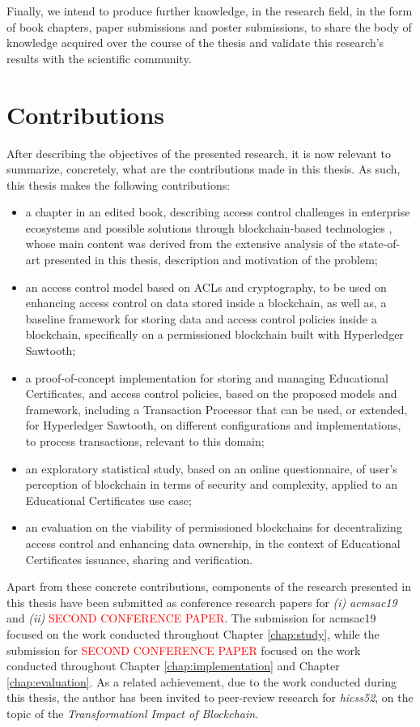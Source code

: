 Finally, we intend to produce further knowledge, in the research field, in the form of book chapters, paper submissions and poster submissions, to share the body of knowledge acquired over the course of the thesis and validate this research's results with the scientific community.

\section{Contributions}
\label{sec:contributions}

After describing the objectives of the presented research, it is now relevant to summarize, concretely, what are the contributions made in this thesis. As such, this thesis makes the following contributions:

\begin{itemize}
	\item a chapter in an edited book, describing access control challenges in enterprise ecosystems and possible solutions through blockchain-based technologies \cite{bryan_christiansen_access_2018}, whose main content was derived from the extensive analysis of the state-of-art presented in this thesis, description and motivation of the problem;
	\item an access control model based on ACLs and cryptography, to be used on enhancing access control on data stored inside a blockchain, as well as, a baseline framework for storing data and access control policies inside a blockchain, specifically on a permissioned blockchain built with Hyperledger Sawtooth;
	\item a proof-of-concept implementation for storing and managing Educational Certificates, and access control policies, based on the proposed models and framework, including a Transaction Processor that can be used, or extended, for Hyperledger Sawtooth, on different configurations and implementations, to process transactions, relevant to this domain;
	\item an exploratory statistical study, based on an online questionnaire, of user's perception of blockchain in terms of security and complexity, applied to an Educational Certificates use case;
	\item an evaluation on the viability of permissioned blockchains for decentralizing access control and enhancing data ownership, in the context of Educational Certificates issuance, sharing and verification.
\end{itemize}

Apart from these concrete contributions, components of the research presented in this thesis have been submitted as conference research papers for \emph{(i)} \textit{\gls{acmsac19}} and \emph{(ii)} \textcolor{red}{SECOND CONFERENCE PAPER}. The submission for \gls{acmsac19} focused on the work conducted throughout Chapter \ref{chap:study}, while the submission for \textcolor{red}{SECOND CONFERENCE PAPER} focused on the work conducted throughout Chapter \ref{chap:implementation} and Chapter \ref{chap:evaluation}. As a related achievement, due to the work conducted during this thesis, the author has been invited to peer-review research for \textit{\glsdesc{hicss52}}, on the topic of the \textit{Transformationl Impact of Blockchain}.

